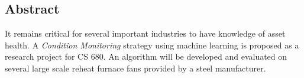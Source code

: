 \begin{center}
\section*{Abstract}
It remains critical for several important industries to have knowledge of asset health.
A \textit{Condition Monitoring} strategy using machine learning is proposed as a research project for CS 680.
An algorithm will be developed and evaluated on several large scale reheat furnace fans provided by a steel manufacturer.
\end{center}
